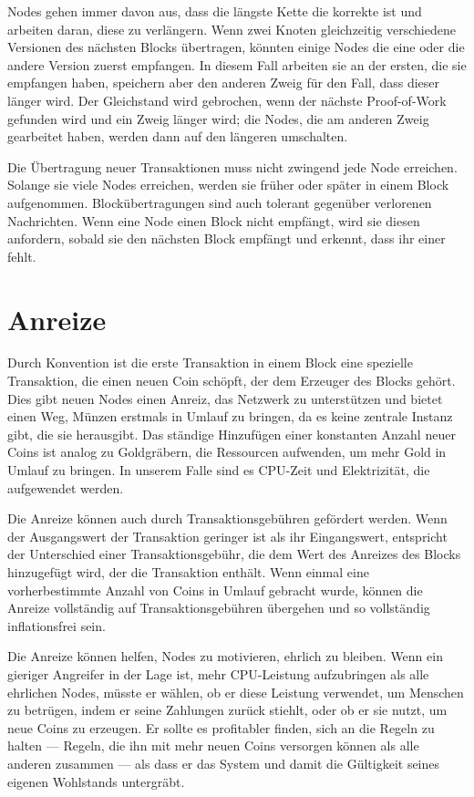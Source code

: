 \documentclass[9pt]{article}
\begin{document}
	Nodes gehen immer davon aus, dass die längste Kette die korrekte ist und arbeiten daran, diese zu verlängern. Wenn zwei Knoten gleichzeitig verschiedene Versionen des nächsten Blocks übertragen, könnten einige Nodes die eine oder die andere Version zuerst empfangen. In diesem Fall arbeiten sie an der ersten, die sie empfangen haben, speichern aber den anderen Zweig für den Fall, dass dieser länger wird. Der Gleichstand wird gebrochen, wenn der nächste Proof-of-Work gefunden wird und ein Zweig länger wird; die Nodes, die am anderen Zweig gearbeitet haben, werden dann auf den längeren umschalten.

	\newpage
	
	Die Übertragung neuer Transaktionen muss nicht zwingend jede Node erreichen. Solange sie viele Nodes erreichen, werden sie früher oder später in einem Block aufgenommen. Blockübertragungen sind auch tolerant gegenüber verlorenen Nachrichten. Wenn eine Node einen Block nicht empfängt, wird sie diesen anfordern, sobald sie den nächsten Block empfängt und erkennt, dass ihr einer fehlt.
	
	\section{Anreize}
	
	Durch Konvention ist die erste Transaktion in einem Block eine spezielle Transaktion, die einen neuen Coin schöpft, der dem Erzeuger des Blocks gehört. Dies gibt neuen Nodes einen Anreiz, das Netzwerk zu unterstützen und bietet einen Weg, Münzen erstmals in Umlauf zu bringen, da es keine zentrale Instanz gibt, die sie herausgibt. Das ständige Hinzufügen einer konstanten Anzahl neuer Coins ist analog zu Goldgräbern, die Ressourcen aufwenden, um mehr Gold in Umlauf zu bringen. In unserem Falle sind es CPU-Zeit und Elektrizität, die aufgewendet werden.

	Die Anreize können auch durch Transaktionsgebühren gefördert werden. Wenn der Ausgangswert der Transaktion geringer ist als ihr Eingangswert, entspricht der Unterschied einer Transaktionsgebühr, die dem Wert des Anreizes des Blocks hinzugefügt wird, der die Transaktion enthält. Wenn einmal eine vorherbestimmte Anzahl von Coins in Umlauf gebracht wurde, können die Anreize vollständig auf Transaktionsgebühren übergehen und so vollständig inflationsfrei sein.

	Die Anreize können helfen, Nodes zu motivieren, ehrlich zu bleiben. Wenn ein gieriger Angreifer in der Lage ist, mehr CPU-Leistung aufzubringen als alle ehrlichen Nodes, müsste er wählen, ob er diese Leistung verwendet, um Menschen zu betrügen, indem er seine Zahlungen zurück stiehlt, oder ob er sie nutzt, um neue Coins zu erzeugen. Er sollte es profitabler finden, sich an die Regeln zu halten — Regeln, die ihn mit mehr neuen Coins versorgen können als alle anderen zusammen — als dass er das System und damit die Gültigkeit seines eigenen Wohlstands untergräbt.
\end{document}
